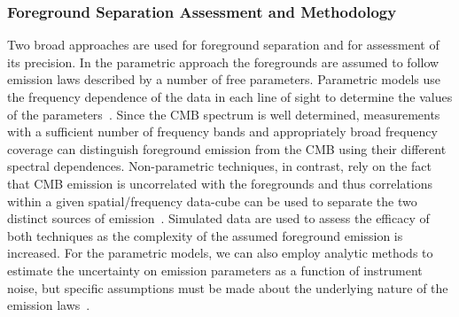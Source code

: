 \documentclass[PICOReport.tex]{subfiles}
\begin{document}
\subsubsection{Foreground Separation Assessment and Methodology}
\label{sec:foreground_separation_methodology}




Two broad approaches are used for foreground separation and for assessment of its precision.  In the parametric approach the foregrounds are assumed to follow emission laws described by a number of free parameters. Parametric models use the frequency dependence of the data in each line of sight to determine the values of the parameters~\citep{eriksen/etal:2008}.  Since the CMB spectrum is well determined, measurements with a sufficient number of frequency bands and appropriately broad frequency coverage can distinguish foreground emission from the CMB using their different spectral dependences. Non-parametric techniques, in contrast, rely on the fact that CMB emission is uncorrelated with the foregrounds and thus correlations within a given spatial/frequency data-cube can be used to separate the two distinct sources of emission~\citep{delabrouille2003,Cardoso2008,Delabrouille2009,nilc,gnilc}.  Simulated data are used to assess the efficacy of both techniques as the complexity of the assumed foreground emission is increased. For the parametric models, we can also employ analytic methods to estimate the uncertainty on emission parameters as a function of instrument noise, but specific assumptions must be made about the underlying nature of the emission laws~\citep{errard_and_finney}. 
\end{document}
